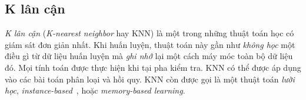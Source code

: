 \subsection{K lân cận}
\textit{K lân cận} (\textit{K-nearest neighbor} hay KNN) là một trong những
thuật toán học có giám sát đơn giản nhất. Khi huấn luyện, thuật toán này gần như
\textit{không học} một điều gì từ dữ liệu huấn luyện mà \textit{ghi nhớ} lại một
cách máy móc toàn bộ dữ liệu đó. Mọi tính toán được thực hiện khi tại pha kiểm
tra. KNN có thể được áp dụng vào các bài toán phân loại và hồi quy. KNN còn được
gọi là một thuật toán \textit{lười học},
\textit{instance-based}~\cite{aha1991instance}, hoặc \textit{memory-based
learning}.





